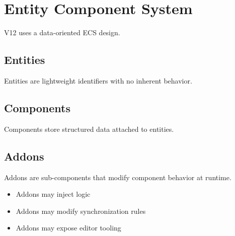 \section{Entity Component System}

V12 uses a data-oriented ECS design.

\subsection{Entities}
Entities are lightweight identifiers with no inherent behavior.

\subsection{Components}
Components store structured data attached to entities.

\subsection{Addons}
Addons are sub-components that modify component behavior at runtime.

\begin{itemize}
	\item Addons may inject logic
	\item Addons may modify synchronization rules
	\item Addons may expose editor tooling
\end{itemize}
